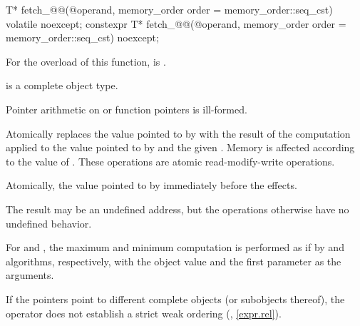 %
%
%
%
%
%
%
%
%
%
%
%
\begin{itemdecl}
T* fetch_@@(@\seeabovenc@ operand, memory_order order = memory_order::seq_cst) volatile noexcept;
constexpr T* fetch_@@(@\seeabovenc@ operand, memory_order order = memory_order::seq_cst) noexcept;
\end{itemdecl}

\begin{itemdescr}
\pnum
\constraints
For the  overload of this function,
 is .

\pnum
\mandates
{} is a complete object type.
\begin{note}
Pointer arithmetic on  or function pointers is ill-formed.
\end{note}

\pnum
\effects
Atomically replaces the value pointed to by
 with the result of the computation applied to the
value pointed to by  and the given .
Memory is affected according to the value of .
These operations are atomic read-modify-write operations.

\pnum
\returns
Atomically, the value pointed to by  immediately before the effects.

\pnum
\remarks
The result may be an undefined address,
but the operations otherwise have no undefined behavior.

\pnum
For  and , the maximum and minimum
computation is performed as if by  and 
algorithms, respectively, with the object value and the first
parameter as the arguments.

\begin{note}
If the pointers point to different complete objects (or subobjects thereof),
the \tcode{<} operator does not establish a strict weak ordering
(, \ref{expr.rel}).
\end{note}
\end{itemdescr}

